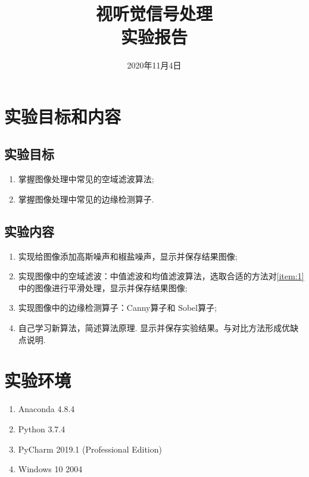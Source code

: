 \documentclass{hitreport}
\title{视听觉信号处理\\实验报告}
\date{2020年11月4日}
\begin{document}
\maketitle

\tableofcontents
\newpage




\section{实验目标和内容}

\subsection{实验目标}
\begin{enumerate}
\item 掌握图像处理中常见的空域滤波算法;
\item 掌握图像处理中常见的边缘检测算子.
\end{enumerate}

\subsection{实验内容}
\begin{enumerate}
\item \label{item:1}实现给图像添加高斯噪声和椒盐噪声，显示并保存结果图像;
\item 实现图像中的空域滤波：中值滤波和均值滤波算法，选取合适的方法对\ref{item:1}中的图像进行平滑处理，显示并保存结果图像;
\item 实现图像中的边缘检测算子：Canny算子和 Sobel算子;
\item 自己学习新算法，简述算法原理. 显示并保存实验结果。与对比方法形成优缺点说明.
\end{enumerate}

\section{实验环境}

\begin{enumerate}
\item Anaconda 4.8.4
\item Python 3.7.4
\item PyCharm 2019.1 (Professional Edition)
\item Windows 10 2004
\end{enumerate}
\end{document}
